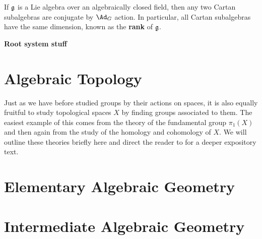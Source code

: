 		\begin{prop}
			If $\frak g$ is a Lie algebra over an algebraically closed field, then any two Cartan subalgebras are conjugate by $\Ad_G$ action. In particular, all Cartan subalgebras have the same dimension, known as the \textbf{rank} of $\frak g$.
		\end{prop}
		
		\textbf{Root system stuff}
		
		
	
	\section{Algebraic Topology} %
	\label{sec:algebraic_topology}
	
	Just as we have before studied groups by their actions on spaces, it is also equally fruitful to study topological spaces $X$ by finding groups associated to them. The easiest example of this comes from the theory of the fundamental group $\pi_1 (X)$ and then again from the study of the homology and cohomology of $X$. We will outline these theories briefly here and direct the reader to \cite{hatcher} for a deeper expository text.
	
	


	\section{Elementary Algebraic Geometry} %
	\label{sec:elementary_algebraic_geometry}

	
	\section{Intermediate Algebraic Geometry} %
	\label{sec:intermediate_algebraic_geometry}
	
